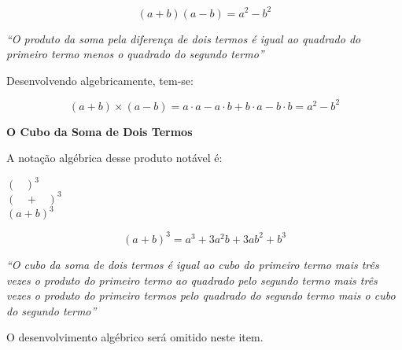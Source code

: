 	\[
	( a + b ) ( a - b ) = a^2 - b^2
	\]
	
	\textit{“O produto da soma pela diferença de dois termos é igual ao quadrado do primeiro termo menos o quadrado do segundo termo''}
	
	Desenvolvendo algebricamente, tem-se:
	
	\[
	( a + b ) \times ( a - b ) = a \cdot a - a \cdot b + b \cdot a - b \cdot b = a^2 - b^2
	\]

        \begin{texample}
        \centering
        \end{texample}

    \noindent
	\textbf{O Cubo da Soma de Dois Termos}
	
	A notação algébrica desse produto notável é:

        \begin{tcolorbox}[colback=white,colframe=minha_cor,coltitle=black,title=O Cubo da Soma de Dois Termos] 
        \centering
         $( \;\;\;)^3$ \\[0.25cm]
         $(\;\;\;+\;\;\;)^3$ \\[0.25cm]
         $( a + b )^3$
        \end{tcolorbox}
	
	\[
	( a + b )^3 = a^3 + 3 a^2 b + 3 a b^2 + b^3 
	\]
	
	\textit{“O cubo da soma de dois termos é igual ao cubo do primeiro termo mais três vezes o produto do primeiro termo ao quadrado pelo segundo termo mais três vezes o produto do primeiro termos pelo quadrado do segundo termo mais o cubo do segundo termo''}
	
	O desenvolvimento algébrico será omitido neste item.

        \begin{texample}
        \centering
        \end{texample}

